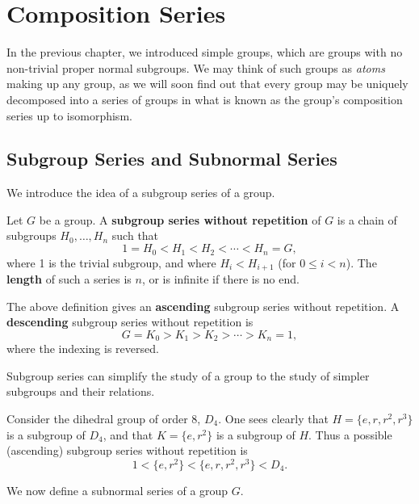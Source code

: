 \chapter{Composition Series}
In the previous chapter, we introduced simple groups, which are groups with no non-trivial proper normal subgroups. We may think of such groups as \textit{atoms} making up any group, as we will soon find out that every group may be uniquely decomposed into a series of groups in what is known as the group's composition series up to isomorphism.

\section{Subgroup Series and Subnormal Series}
We introduce the idea of a subgroup series of a group.

\begin{definition}
    Let $G$ be a group. A \textbf{subgroup series without repetition} of $G$ is a chain of subgroups $H_0, \dots, H_n$ such that
    \[
        1 = H_0 < H_1 < H_2 < \cdots < H_n = G,
    \]
    where 1 is the trivial subgroup, and where $H_i < H_{i+1}$ (for $0 \leq i < n$). The \textbf{length} of such a series is $n$, or is infinite if there is no end.
\end{definition}
\begin{remark}
    The above definition gives an \textbf{ascending} subgroup series without repetition. A \textbf{descending} subgroup series without repetition is
    \[
        G = K_0 > K_1 > K_2 > \cdots > K_n = 1,
    \]
    where the indexing is reversed.
\end{remark}

Subgroup series can simplify the study of a group to the study of simpler subgroups and their relations.

\begin{example}
    Consider the dihedral group of order 8, $D_4$. One sees clearly that $H = \{e, r, r^2, r^3\}$ is a subgroup of $D_4$, and that $K = \{e, r^2\}$ is a subgroup of $H$. Thus a possible (ascending) subgroup series without repetition is
    \[
        1 < \{e, r^2\} < \{e, r, r^2, r^3\} < D_4.
    \]
\end{example}

We now define a subnormal series of a group $G$.

